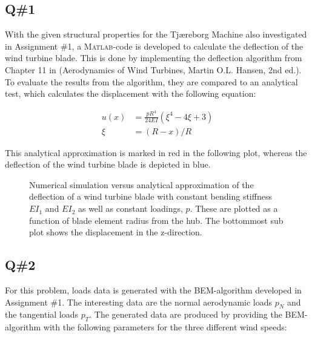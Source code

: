 




\subsection*{Q\#1}
With the given structural properties for the Tjæreborg Machine also investigated in Assignment \#1, a \textsc{Matlab}-code is developed to calculate the deflection of the wind turbine blade. This is done by implementing the deflection algorithm from Chapter 11 in (Aerodynamics of Wind Turbines, Martin O.L. Hansen, 2nd ed.).\\
To evaluate the results from the algorithm, they are compared to an analytical test, which calculates the displacement with the following equation:

\begin{align*}
u(x) &= \frac{pR^4}{24 EI} (\xi^4 -4\xi +3)\\
\xi &= (R-x)/R
\end{align*}

This analytical approximation is marked in red in the following plot, whereas the deflection of the wind turbine blade is depicted in blue. 

\setlength\figureheight{7cm}
\setlength\figurewidth{13cm}
\begin{figure}[H]
	\hspace*{-1.8cm}
	\centering
	
	\caption{\small{Numerical simulation versus analytical approximation of the deflection of a wind turbine blade with constant bending stiffness $EI_1$ and $EI_2$ as well as constant loadings, $p$. These are plotted as a function of blade element radius from the hub. The bottommost sub plot shows the displacement in the z-direction.}}
	\label{q1_p1}
\end{figure}

\subsection*{Q\#2}

For this problem, loads data is generated with the BEM-algorithm developed in Assignment \#1. The interesting data are the normal aerodynamic loads $p_N$ and the tangential loads $p_T$. 
The generated data are produced by providing the BEM-algorithm with the following parameters for the three different wind speeds:

